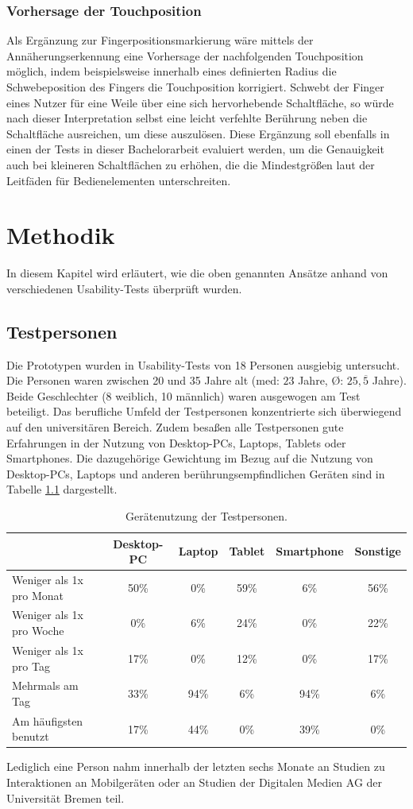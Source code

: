 \documentclass[a4paper,12pt,bibliography=totoc]{scrreprt}%
\begin{document}
\subsection{Vorhersage der Touchposition}
Als Ergänzung zur Fingerpositionsmarkierung wäre mittels der Annäherungserkennung eine Vorhersage der nachfolgenden Touchposition möglich, indem beispielsweise innerhalb eines definierten Radius die Schwebeposition des Fingers die Touchposition korrigiert. Schwebt der Finger eines Nutzer für eine Weile über eine sich hervorhebende Schaltfläche, so würde nach dieser Interpretation selbst eine leicht verfehlte Berührung neben die Schaltfläche ausreichen, um diese auszulösen. Diese Ergänzung soll ebenfalls in einen der Tests in dieser Bachelorarbeit evaluiert werden, um die Genauigkeit auch bei kleineren Schaltflächen zu erhöhen, die die Mindestgrößen laut der Leitfäden für Bedienelementen unterschreiten.

\chapter{Methodik}
In diesem Kapitel wird erläutert, wie die oben genannten Ansätze anhand von verschiedenen Usability-Tests überprüft wurden.

\section{Testpersonen}
Die Prototypen wurden in Usability-Tests von 18 Personen ausgiebig untersucht. Die Personen waren zwischen 20 und 35 Jahre alt (med: $23$ Jahre, \O: $25{,}\overline 5$ Jahre). Beide Geschlechter (8 weiblich, 10 männlich) waren ausgewogen am Test beteiligt. Das berufliche Umfeld der Testpersonen konzentrierte sich überwiegend auf den universitären Bereich. Zudem besaßen alle Testpersonen gute Erfahrungen in der Nutzung von Desktop-PCs, Laptops, Tablets oder Smartphones. Die dazugehörige Gewichtung im Bezug auf die Nutzung von Desktop-PCs, Laptops und anderen berührungsempfindlichen Geräten sind in Tabelle \ref{nutzungtestpersonen} dargestellt.
\begin{table}
\centering
\renewcommand{\arraystretch}{2}
\setlength{\tabcolsep}{4pt}
\begin{tabular}{ p{4.8cm} | c c c c c}
& Desktop-PC & Laptop & Tablet & Smartphone & Sonstige\\\hline
Weniger als 1x pro Monat & 50\% & 0\% & 59\% & 6\% & 56\%\\
Weniger als 1x pro Woche & 0\% & 6\% & 24\% & 0\% & 22\% \\
Weniger als 1x pro Tag & 17\% & 0\% & 12\% & 0\% & 17\% \\
Mehrmals am Tag & 33\% & 94\% & 6\% & 94\% & 6\% \\
\hline
Am häufigsten benutzt & 17\% & 44\% & 0\% & 39\% & 0\% \\
\end{tabular}
\caption{Gerätenutzung der Testpersonen.}
\label{nutzungtestpersonen}
\end{table}
Lediglich eine Person nahm innerhalb der letzten sechs Monate an Studien zu Interaktionen an Mobilgeräten oder an Studien der Digitalen Medien AG der Universität Bremen teil.
\end{document}
